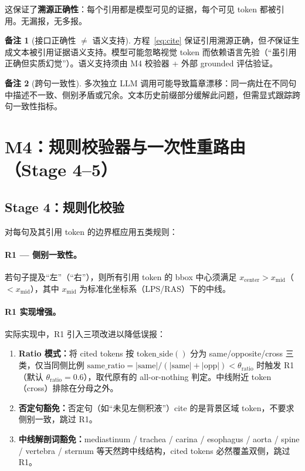 \documentclass[11pt,a4paper]{article}
\theoremstyle{definition}
\newtheorem{remark}{备注}[section]
\begin{document}
这保证了\textbf{溯源正确性}：每个引用都是模型可见的证据，每个可见 token 都被引用。无漏报，无多报。

\begin{remark}[接口正确性 $\neq$ 语义支持]
方程~\eqref{eq:cite} 保证引用溯源正确，但\emph{不}保证生成文本被引用证据语义支持。模型可能忽略视觉 token 而依赖语言先验（``虽引用正确但实质幻觉''）。语义支持须由 M4 校验器 + 外部 grounded 评估验证。
\end{remark}

\begin{remark}[跨句一致性]
多次独立 LLM 调用可能导致篇章漂移：同一病灶在不同句中描述不一致、侧别矛盾或冗余。文本历史前缀部分缓解此问题，但需显式跟踪跨句一致性指标。
\end{remark}


\section{M4：规则校验器与一次性重路由（Stage 4--5）}

\subsection{Stage 4：规则化校验}

对每句及其引用 token 的边界框应用五类规则：

\paragraph{R1 --- 侧别一致性。}
若句子提及``左''（``右''），则所有引用 token 的 bbox 中心须满足 $x_{\mathrm{center}} > x_{\mathrm{mid}}$（$< x_{\mathrm{mid}}$），其中 $x_{\mathrm{mid}}$ 为标准化坐标系（LPS/RAS）下的中线。

\paragraph{R1 实现增强。}
实际实现中，R1 引入三项改进以降低误报：
\begin{enumerate}[nosep]
    \item \textbf{Ratio 模式：}将 cited tokens 按 $\mathrm{token\_side}()$ 分为 same/opposite/cross 三类，仅当同侧比例 $\mathrm{same\_ratio} = |\mathrm{same}| / (|\mathrm{same}| + |\mathrm{opp}|) < \theta_{\mathrm{ratio}}$ 时触发 R1（默认 $\theta_{\mathrm{ratio}} = 0.6$），取代原有的 all-or-nothing 判定。中线附近 token（cross）排除在分母之外。
    \item \textbf{否定句豁免：}否定句（如``未见左侧积液''）cite 的是背景区域 token，不要求侧别一致，跳过 R1。
    \item \textbf{中线解剖词豁免：}mediastinum / trachea / carina / esophagus / aorta / spine / vertebra / sternum 等天然跨中线结构，cited tokens 必然覆盖双侧，跳过 R1。
\end{enumerate}
\end{document}
